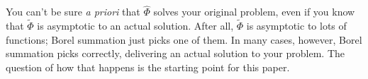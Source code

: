 \documentclass{article}
\newcommand{\done}[1]{\textcolor{gray}{#1}}
\theoremstyle{definition}
\newcommand{\series}[1]{\tilde{#1}}
\newcommand{\laplace}{\mathcal{L}}
\begin{document}
You can't be sure {\em a priori} that $\hat{\Phi}$ solves your original problem, even if you know that $\series{\Phi}$ is asymptotic to an actual solution. After all, $\series{\Phi}$ is asymptotic to lots of functions; Borel summation just picks one of them. In many cases, however, Borel summation picks correctly, delivering an actual solution to your problem. The question of how that happens is the starting point for this paper.

\end{document}
